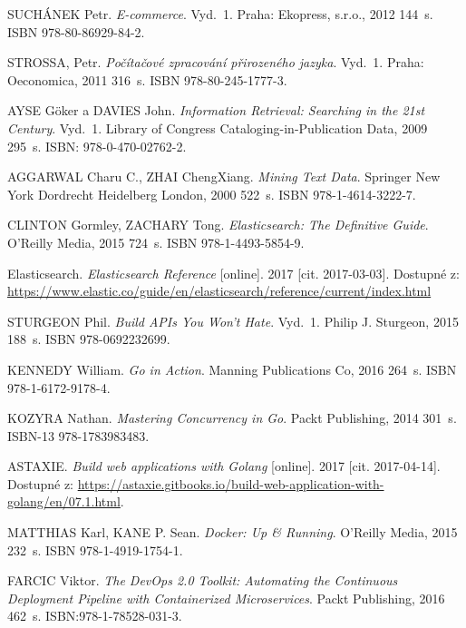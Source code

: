 \documentclass[FM,DP]{tulthesis}
\begin{document}
\begin{thebibliography}{Mm99}


 SUCHÁNEK Petr. \emph{E-commerce}.
Vyd.~1. Praha: Ekopress, s.r.o., 2012 144~s. ISBN 978-80-86929-84-2.


 STROSSA, Petr. \emph{Počítačové zpracování přirozeného jazyka}.
Vyd.~1. Praha: Oeconomica, 2011 316~s. ISBN 978-80-245-1777-3.

 AYSE Göker a DAVIES John.
\emph{Information Retrieval: Searching in the 21st Century}.
Vyd.~1. Library of Congress Cataloging-in-Publication Data, 2009 295~s. ISBN: 978-0-470-02762-2.

 AGGARWAL Charu C., ZHAI ChengXiang. \emph{Mining Text Data}.
Springer New York Dordrecht Heidelberg London, 2000 522~s. ISBN 978-1-4614-3222-7.


 CLINTON Gormley, ZACHARY Tong. \emph{Elasticsearch: The Definitive Guide}.
O'Reilly Media, 2015 724~s. ISBN 978-1-4493-5854-9.

 Elasticsearch. \emph{Elasticsearch Reference} [online].
2017 [cit. 2017-03-03]. Dostupné z:
\url{https://www.elastic.co/guide/en/elasticsearch/reference/current/index.html}


 STURGEON Phil. \emph{Build APIs You Won't Hate}.
Vyd.~1. Philip J. Sturgeon, 2015 188~s. ISBN 978-0692232699.


 KENNEDY William. \emph{Go in Action}.
Manning Publications Co, 2016 264~s. ISBN 978-1-6172-9178-4.

 KOZYRA Nathan. \emph{Mastering Concurrency in Go}.
Packt Publishing, 2014 301~s. ISBN-13 978-1783983483.

 ASTAXIE. \emph{Build web applications with Golang} [online].
2017 [cit. 2017-04-14]. Dostupné z: \url{https://astaxie.gitbooks.io/build-web-application-with-golang/en/07.1.html}.


 MATTHIAS Karl, KANE P. Sean. \emph{Docker: Up \& Running}.
O'Reilly Media, 2015 232~s. ISBN 978-1-4919-1754-1.

 FARCIC Viktor. \emph{The DevOps 2.0 Toolkit: Automating the Continuous Deployment Pipeline 
with Containerized Microservices}. Packt Publishing, 2016 462~s. ISBN:978-1-78528-031-3.


\end{thebibliography}
\end{document}
